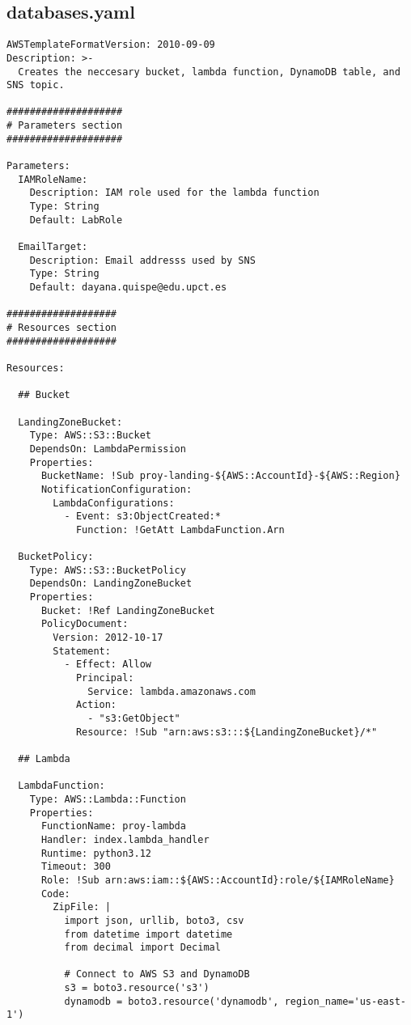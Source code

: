\subsection{databases.yaml}

\begin{verbatim}
AWSTemplateFormatVersion: 2010-09-09
Description: >-
  Creates the neccesary bucket, lambda function, DynamoDB table, and SNS topic.

####################
# Parameters section
####################

Parameters:
  IAMRoleName:
    Description: IAM role used for the lambda function
    Type: String
    Default: LabRole

  EmailTarget:
    Description: Email addresss used by SNS
    Type: String
    Default: dayana.quispe@edu.upct.es

###################
# Resources section
###################

Resources:

  ## Bucket

  LandingZoneBucket:
    Type: AWS::S3::Bucket
    DependsOn: LambdaPermission
    Properties:
      BucketName: !Sub proy-landing-${AWS::AccountId}-${AWS::Region}
      NotificationConfiguration:
        LambdaConfigurations:
          - Event: s3:ObjectCreated:*
            Function: !GetAtt LambdaFunction.Arn

  BucketPolicy:
    Type: AWS::S3::BucketPolicy
    DependsOn: LandingZoneBucket
    Properties:
      Bucket: !Ref LandingZoneBucket
      PolicyDocument:
        Version: 2012-10-17
        Statement:
          - Effect: Allow
            Principal:
              Service: lambda.amazonaws.com
            Action:
              - "s3:GetObject"
            Resource: !Sub "arn:aws:s3:::${LandingZoneBucket}/*"

  ## Lambda

  LambdaFunction:
    Type: AWS::Lambda::Function
    Properties:
      FunctionName: proy-lambda
      Handler: index.lambda_handler
      Runtime: python3.12
      Timeout: 300
      Role: !Sub arn:aws:iam::${AWS::AccountId}:role/${IAMRoleName}
      Code:
        ZipFile: |
          import json, urllib, boto3, csv
          from datetime import datetime
          from decimal import Decimal

          # Connect to AWS S3 and DynamoDB
          s3 = boto3.resource('s3')
          dynamodb = boto3.resource('dynamodb', region_name='us-east-1')


\end{verbatim}
